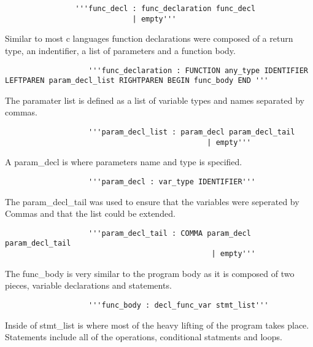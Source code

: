 \documentclass[12pt]{article}
\begin{document}
           \begin{verbatim}
           		'''func_decl : func_declaration func_decl
               	             | empty'''
            \end{verbatim}
            
            Similar to most c languages function declarations were composed of a return type, an indentifier, a list of parameters and a function body.
            
            \begin{verbatim}
                   '''func_declaration : FUNCTION any_type IDENTIFIER LEFTPAREN param_decl_list RIGHTPAREN BEGIN func_body END '''
           \end{verbatim}
           
           The paramater list is defined as a list of variable types and names separated by commas.
           
            \begin{verbatim}
                   '''param_decl_list : param_decl param_decl_tail
                                              | empty'''
           \end{verbatim}
           
			A param_decl is where parameters name and type is specified.
			\begin{verbatim}
                   '''param_decl : var_type IDENTIFIER'''
           \end{verbatim}
			            
           The param_decl_tail was used to ensure that the variables were seperated by Commas and that the list could be extended.
           
           \begin{verbatim}
                   '''param_decl_tail : COMMA param_decl param_decl_tail
					                           | empty'''
           \end{verbatim}
           
           The func_body is very similar to the program body as it is composed of two pieces, variable declarations and statements.
           \begin{verbatim}
                   '''func_body : decl_func_var stmt_list'''
           \end{verbatim}
           
           Inside of stmt_list is where most of the heavy lifting of the program takes place.  Statements include all of the operations, conditional statments and loops.
           
\end{document}
